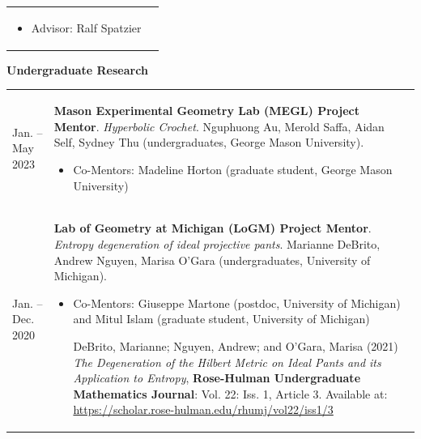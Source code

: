 \begin{center}
{\begin{longtable}{p{}  p{}}
        {\small
        \begin{itemize}
        \setlength{\parindent}{0em}
        \item[] Advisor: Ralf Spatzier
        \end{itemize}
        }
        \vspace{-1em}
         
    \end{longtable}
    } 
    \end{center}

    \vspace{-1em}
    

    \textbf{\large Undergraduate Research}
    
    \begin{center}
    {
    \renewcommand{\arraystretch}{1.5}
    \begin{longtable}{p{}  p{}}
     Jan.  --  May  2023 & \textbf{Mason Experimental Geometry Lab (MEGL) Project Mentor}. \textit{Hyperbolic Crochet}.  Nguphuong Au, Merold Saffa, Aidan Self, Sydney Thu (undergraduates, George Mason University). 
        \hspace{-1em}

        {\small
        \begin{itemize}
        \setlength{\parindent}{0em}
        \item[] 
            Co-Mentors: Madeline Horton (graduate student, George Mason University) 

            
            
        \end{itemize}
        }
        \vspace{-1em}
         \\ 
 Jan.  --  Dec.  2020 & \textbf{Lab of Geometry at Michigan (LoGM) Project Mentor}. \textit{Entropy degeneration of ideal projective pants}.  Marianne DeBrito, Andrew Nguyen, Marisa O'Gara (undergraduates, University of Michigan). 
        \hspace{-1em}

        {\small
        \begin{itemize}
        \setlength{\parindent}{0em}
        \item[] 
            Co-Mentors: Giuseppe Martone (postdoc, University of Michigan) and Mitul Islam (graduate student, University of Michigan) 

            DeBrito, Marianne; Nguyen, Andrew; and O'Gara, Marisa (2021) {\it The Degeneration of the Hilbert Metric on Ideal Pants and its Application to Entropy}, {\bf Rose-Hulman Undergraduate Mathematics Journal}: Vol. 22: Iss. 1, Article 3.
Available at: \url{https://scholar.rose-hulman.edu/rhumj/vol22/iss1/3}
            

\end{itemize}}
\end{longtable}}
\end{center}
